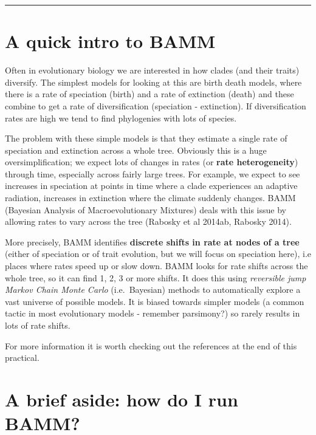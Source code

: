 \documentclass[]{book}
\theoremstyle{definition}
\theoremstyle{definition}
\theoremstyle{definition}
\theoremstyle{remark}
\begin{document}
\begin{center}\rule{0.5\linewidth}{\linethickness}\end{center}

\section{A quick intro to BAMM}\label{a-quick-intro-to-bamm}

Often in evolutionary biology we are interested in how clades (and their
traits) diversify. The simplest models for looking at this are birth
death models, where there is a rate of speciation (birth) and a rate of
extinction (death) and these combine to get a rate of diversification
(speciation - extinction). If diversification rates are high we tend to
find phylogenies with lots of species.

The problem with these simple models is that they estimate a single rate
of speciation and extinction across a whole tree. Obviously this is a
huge oversimplification; we expect lots of changes in rates (or
\textbf{rate heterogeneity}) through time, especially across fairly
large trees. For example, we expect to see increases in speciation at
points in time where a clade experiences an adaptive radiation,
increases in extinction where the climate suddenly changes. BAMM
(Bayesian Analysis of Macroevolutionary Mixtures) deals with this issue
by allowing rates to vary across the tree (Rabosky et al 2014ab, Rabosky
2014).

More precisely, BAMM identifies \textbf{discrete shifts in rate at nodes
of a tree} (either of speciation or of trait evolution, but we will
focus on speciation here), i.e places where rates speed up or slow down.
BAMM looks for rate shifts across the whole tree, so it can find 1, 2, 3
or more shifts. It does this using \emph{reversible jump Markov Chain
Monte Carlo} (i.e.~Bayesian) methods to automatically explore a vast
universe of possible models. It is biased towards simpler models (a
common tactic in most evolutionary models - remember parsimony?) so
rarely results in lots of rate shifts.

For more information it is worth checking out the references at the end
of this practical.

\section{A brief aside: how do I run
BAMM?}\label{a-brief-aside-how-do-i-run-bamm}
\end{document}

